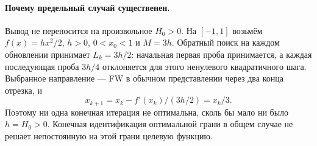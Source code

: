 \paragraph{Почему предельный случай существенен.}
Вывод не переносится на произвольное $H_0>0$. На $[-1,1]$
возьмём $f(x)=h x^2/2$, $h>0$, $0<x_0<1$ и $M=3h$.
Обратный поиск на каждом обновлении принимает $L_k=3h/2$:
начальная первая проба принимается, а каждая последующая проба
$3h/4$ отклоняется для этого ненулевого квадратичного шага.
Выбранное направление — FW в обычном представлении через два
конца отрезка, и
\[
 x_{k+1}=x_k-f'(x_k)/(3h/2)=x_k/3.
\]
Поэтому ни одна конечная итерация не оптимальна, сколь бы мало ни
было $h=H_0>0$. Конечная идентификация оптимальной грани в общем
случае не решает непостоянную на этой грани целевую функцию.
